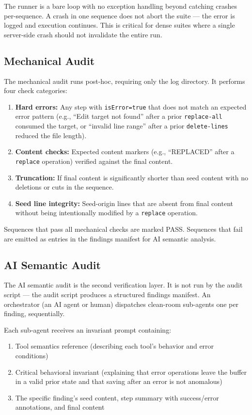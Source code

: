 \documentclass{article}
\begin{document}
The runner is a bare loop with no exception handling beyond catching crashes
per-sequence. A crash in one sequence does not abort the suite --- the error
is logged and execution continues. This is critical for dense suites where a
single server-side crash should not invalidate the entire run.

\subsection{Mechanical Audit}
\label{sec:mechanical-audit}

The mechanical audit runs post-hoc, requiring only the log directory. It
performs four check categories:

\begin{enumerate}
\item \textbf{Hard errors:} Any step with \texttt{isError=true} that does not
match an expected error pattern (e.g., ``Edit target not found'' after a prior
\texttt{replace-all} consumed the target, or ``invalid line range'' after a
prior \texttt{delete-lines} reduced the file length).
\item \textbf{Content checks:} Expected content markers (e.g., ``REPLACED''
after a \texttt{replace} operation) verified against the final content.
\item \textbf{Truncation:} If final content is significantly shorter than seed
content with no deletions or cuts in the sequence.
\item \textbf{Seed line integrity:} Seed-origin lines that are absent from
final content without being intentionally modified by a \texttt{replace}
operation.
\end{enumerate}

Sequences that pass all mechanical checks are marked PASS. Sequences that fail
are emitted as entries in the findings manifest for AI semantic analysis.

\subsection{AI Semantic Audit}
\label{sec:semantic-audit}

The AI semantic audit is the second verification layer. It is not run by the
audit script --- the audit script produces a structured findings manifest.
An orchestrator (an AI agent or human) dispatches clean-room sub-agents one
per finding, sequentially.

Each sub-agent receives an invariant prompt containing:
\begin{enumerate}
\item Tool semantics reference (describing each tool's behavior and error
conditions)
\item Critical behavioral invariant (explaining that error operations leave the
buffer in a valid prior state and that saving after an error is not anomalous)
\item The specific finding's seed content, step summary with success/error
annotations, and final content
\end{enumerate}
\end{document}
